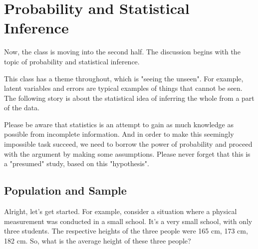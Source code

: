 \documentclass{ltjsbook}
\begin{document}
\chapter{Probability and Statistical Inference}
\label{m16_inference}
Now, the class is moving into the second half.
The discussion begins with the topic of probability and statistical inference.

This class has a theme throughout, which is "seeing the unseen".
For example, latent variables and errors are typical examples of things that cannot be seen. The following story is about the statistical idea of inferring the whole from a part of the data.

Please be aware that statistics is an attempt to gain as much knowledge as possible from incomplete information. And in order to make this seemingly impossible task succeed, we need to borrow the power of probability and proceed with the argument by making some assumptions.
Please never forget that this is a "presumed" study, based on this "hypothesis".

\section{Population and Sample}
Alright, let's get started.
For example, consider a situation where a physical measurement was conducted in a small school.
It's a very small school, with only three students.
The respective heights of the three people were 165 cm, 173 cm, 182 cm.
So, what is the average height of these three people?
\end{document}
